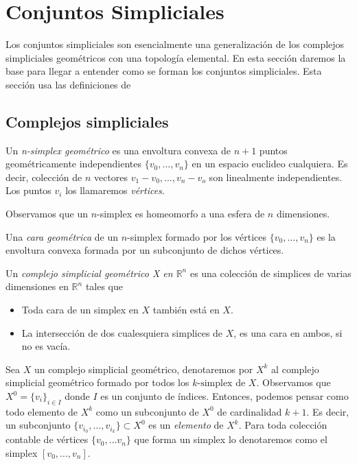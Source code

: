 \documentclass[../main.tex]{subfiles}
\begin{document}
\section{Conjuntos Simpliciales}
Los conjuntos simpliciales son esencialmente una generalizaci\'on de los complejos simpliciales geom\'etricos con una topolog\'ia elemental. En esta secci\'on daremos la base para llegar a entender como se forman los conjuntos simpliciales. Esta secci\'on usa las definiciones de \cite[Cap\'itulo 2 y 3]{SS}
\subsection{Complejos simpliciales}
\begin{defi}
    Un \emph{n-simplex geom\'etrico} es una envoltura convexa de $n+1$ puntos geom\'etricamente independientes $\{v_0,\dots,v_n\}$ en un espacio euclideo cualquiera. Es decir, colecci\'on de $n$ vectores $v_1-v_0,\dots,v_n-v_o$ son linealmente independientes.
    Los puntos $v_i$ los llamaremos \emph{v\'ertices}.

    Observamos que un $n$-simplex es homeomorfo a una esfera de $n$ dimensiones.
\end{defi}
\begin{defi}
    Una \emph{cara geom\'etrica} de un $n$-simplex formado por los v\'ertices $\{v_0,\dots,v_n\}$ es la envoltura convexa formada por un subconjunto de dichos v\'ertices.
\end{defi}
\begin{defi}
    Un \emph{complejo simplicial geom\'etrico X en $\mathbb{R}^n$} es una colecci\'on de simplices de varias dimensiones en $\mathbb{R}^n$ tales que
    \begin{itemize}
        \item Toda cara de un simplex en $X$ tambi\'en est\'a en $X$.
        \item La intersecci\'on de dos cualesquiera simplices de $X$, es una cara en ambos, si no es vac\'ia.
    \end{itemize}
\end{defi}

Sea $X$ un complejo simplicial geom\'etrico, denotaremos por  $X^k$ al complejo simplicial geom\'etrico formado por todos los $k\text{-simplex}$ de $X$.
Observamos que $X^0 = \{v_i\}_{i\in I}$ donde $I$ es un conjunto de \'indices. Entonces, podemos pensar como todo elemento de $X^k$ como un subconjunto de $X^0$ de cardinalidad $k+1$.
Es decir, un subconjunto $\{v_{i_0},\dots,v_{i_k}\}\subset X^0$ es un \emph{elemento} de $X^k$.
Para toda colecci\'on contable de v\'ertices $\{v_0,\dots v_n\}$ que forma un simplex lo denotaremos como el simplex $[v_0,\dots,v_n]$.
\end{document}
